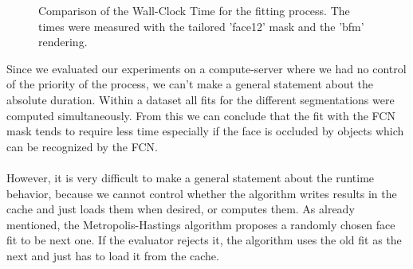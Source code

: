 \begin{figure}
	\begin{center}
	\end{center}
	\caption{Comparison of the Wall-Clock Time for the fitting process. The times were measured with the tailored 'face12' mask and the 'bfm' rendering.}
	\label{fig:chap3:times}
\end{figure}

Since we evaluated our experiments on a compute-server where we had no control of the priority of the process, we can't make a general statement about the absolute duration. Within a dataset all fits for the different segmentations were computed simultaneously. From this we can conclude that the fit with the FCN mask tends to require less time especially if the face is occluded by objects which can be recognized by the FCN.\\
\\
However, it is very difficult to make a general statement about the runtime behavior, because we cannot control whether the algorithm writes results in the cache and just loads them when desired, or computes them. As already mentioned, the Metropolis-Hastings algorithm proposes a randomly chosen face fit to be next one. If the evaluator rejects it, the algorithm uses the old fit as the next and just has to load it from the cache.  
